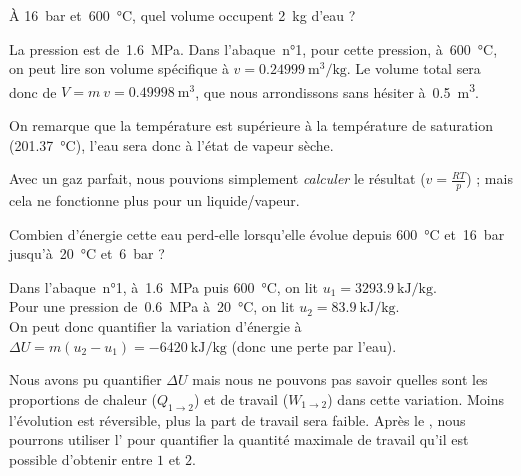 			\begin{anexample}
			À \SI{16}{\bar} et~\SI{600}{\degreeCelsius}, quel volume occupent \SI{2}{\kilogram} d’eau ?
			
				\begin{answer}La pression est de~\SI{1,6}{\mega\pascal}. Dans l’abaque~n°1, pour cette pression, à~\SI{600}{\degreeCelsius}, on peut lire son volume spécifique à $v = \SI{0,24999}{\metre\cubed\per\kilogram}$. Le volume total sera donc de $V = m \ v = \SI{0,49998}{\metre\cubed}$, que nous arrondissons sans hésiter à~\SI{0,5}{\metre\cubed}.
					\begin{remark}On remarque que la température est supérieure à la température de saturation (\SI{201,37}{\degreeCelsius}), l’eau sera donc à l’état de vapeur sèche.\end{remark}
					\begin{remark}Avec un gaz parfait, nous pouvions simplement \emph{calculer} le résultat ($v = \frac{R T}{p}$) ; mais cela ne fonctionne plus pour un liquide/vapeur.\end{remark}\end{answer}
			\end{anexample}

			\begin{anexample}
			Combien d’énergie cette eau perd-elle lorsqu’elle évolue depuis \SI{600}{\degreeCelsius} et~\SI{16}{\bar} jusqu’à~\SI{20}{\degreeCelsius} et~\SI{6}{\bar} ?
			
				\begin{answer}Dans l’abaque~n°1, à~\SI{1,6}{\mega\pascal} puis \SI{600}{\degreeCelsius}, on lit $u_1 = \SI{3293,9}{\kilo\joule\per\kilogram}$.\\
				Pour une pression de~\SI{0,6}{\mega\pascal} à~\SI{20}{\degreeCelsius}, on lit $u_2 = \SI{83,9}{\kilo\joule\per\kilogram}$.\\
				On peut donc quantifier la variation d’énergie à $\Delta U = m (u_2 - u_1) = \SI{-6420}{\kilo\joule\per\kilogram}$ (donc une perte par l’eau).
			
				\begin{remark}Nous avons pu quantifier $\Delta U$ mais nous ne pouvons pas savoir quelles sont les proportions de chaleur ($Q_{1 \to 2}$) et de travail ($W_{1 \to 2}$) dans cette variation. Moins l’évolution est réversible, plus la part de travail sera faible. Après le \courshuit, nous pourrons utiliser l’ pour quantifier la quantité maximale de travail qu’il est possible d’obtenir entre $1$ et $2$.\end{remark}\end{answer}
			\end{anexample}
	
